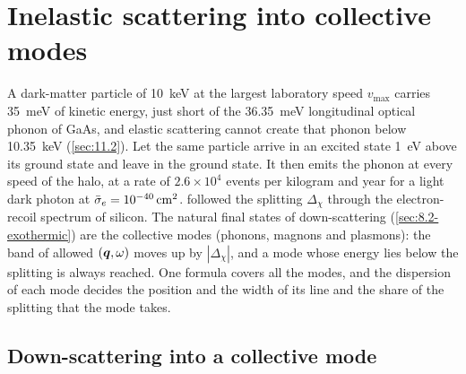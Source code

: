 \section{Inelastic scattering into collective modes}\label{sec:17.3}

A dark-matter particle of \SI{10}{keV} at the largest laboratory speed $v_{\mathrm{max}}$ carries \SI{35}{meV} of kinetic energy, just short of the \SI{36.35}{meV} longitudinal optical phonon of GaAs, and elastic scattering cannot create that phonon below \SI{10.35}{keV} (\cref{sec:11.2}). Let the same particle arrive in an excited state \SI{1}{eV} above its ground state and leave in the ground state. It then emits the phonon at every speed of the halo, at a rate of $2.6\times10^4$ events per kilogram and year for a light dark photon at $\bar{\sigma}_{e} = \SI{e-40}{cm^2}$.  followed the splitting $\Delta_\chi$ through the electron-recoil spectrum of silicon. The natural final states of down-scattering (\cref{sec:8.2-exothermic}) are the collective modes (phonons, magnons and plasmons): the band of allowed $(\bm{q},\omega)$ moves up by $|\Delta_\chi|$, and a mode whose energy lies below the splitting is always reached. One formula covers all the modes, and the dispersion of each mode decides the position and the width of its line and the share of the splitting that the mode takes.

\subsection{Down-scattering into a collective mode}\label{sec:17.3-shell}

